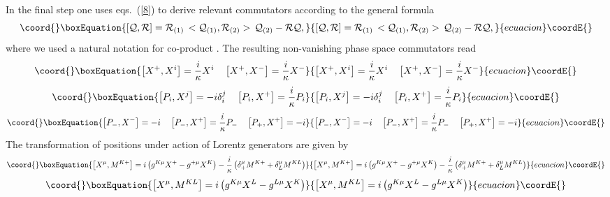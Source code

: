 \documentclass [12pt]  {article}
\begin{document}
In the final step one uses eqs.~(\ref{8}) to derive relevant
commutators according to the general formula
\begin{equation}\coord{}\boxEquation{\label{9}
 \left[{\cal Q}, {\cal R}\right] = {\cal R}_{(1)}\, <{\cal Q}_{(1)},{\cal R}_{(2)}>\, {\cal Q}_{(2)}
-{\cal R}{\cal Q},
}{\left[{\cal Q}, {\cal R}\right] = {\cal R}_{(1)}\, <{\cal Q}_{(1)},{\cal R}_{(2)}>\, {\cal Q}_{(2)}
-{\cal R}{\cal Q},
}{ecuacion}\coordE{}\end{equation}
where we used a natural notation for co-product \coordHE{}. The resulting
non-vanishing phase space commutators read
\begin{equation}\coord{}\boxEquation{\label{10}
\left[X^{+},X^{i}\right]=\frac{i}{\kappa}X^i\quad
\left[X^{+},X^{-}\right]=\frac{i}{\kappa}X^-
}{\left[X^{+},X^{i}\right]=\frac{i}{\kappa}X^i\quad
\left[X^{+},X^{-}\right]=\frac{i}{\kappa}X^-
}{ecuacion}\coordE{}\end{equation}
\begin{equation}\coord{}\boxEquation{\label{11a}
\left[P_{i},X^{j}\right]=-i\delta_{i}^{j}\quad
\left[P_{i},X^{+}\right]=\frac{i}{\kappa}P_i
}{\left[P_{i},X^{j}\right]=-i\delta_{i}^{j}\quad
\left[P_{i},X^{+}\right]=\frac{i}{\kappa}P_i
}{ecuacion}\coordE{}\end{equation}
\begin{equation}\coord{}\boxEquation{\label{11b}
\left[P_{-},X^{-}\right]= -i\quad
\left[P_{-},X^{+}\right]=\frac{i}{\kappa}P_-\quad
\left[P_{+},X^{+}\right]=-i
}{\left[P_{-},X^{-}\right]= -i\quad
\left[P_{-},X^{+}\right]=\frac{i}{\kappa}P_-\quad
\left[P_{+},X^{+}\right]=-i
}{ecuacion}\coordE{}\end{equation}
The transformation of positions under action of Lorentz generators
are given by
\begin{equation}\coord{}\boxEquation{\label{12a}
\left[X^{\mu},M^{K+}\right]=i\left(g^{K\mu}X^{+}-g^{+\mu}X^{K}\right)
-\frac{i}{\kappa}\left(\delta_{+}^{\mu}M^{K+}+\delta_{L}^{\mu}M^{KL}\right)
}{\left[X^{\mu},M^{K+}\right]=i\left(g^{K\mu}X^{+}-g^{+\mu}X^{K}\right)
-\frac{i}{\kappa}\left(\delta_{+}^{\mu}M^{K+}+\delta_{L}^{\mu}M^{KL}\right)
}{ecuacion}\coordE{}\end{equation}
\begin{equation}\coord{}\boxEquation{\label{12b}
\left[X^{\mu},M^{KL}\right]=i\left(g^{K\mu}X^{L}-g^{L\mu}X^{K}\right)
}{\left[X^{\mu},M^{KL}\right]=i\left(g^{K\mu}X^{L}-g^{L\mu}X^{K}\right)
}{ecuacion}\coordE{}\end{equation}
\end{document}
